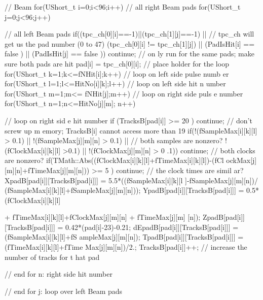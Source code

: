 \begin{DoxyCode}
{{{{{{{{{{          // Beam
          for(UShort_t i=0;i<96;i++) // all right Beam pads
            for(UShort_t j=0;j<96;j++){ // all left Beam pads
              if((tpc_ch[0][i]==-1)||(tpc_ch[1][j]==-1) || // tpc_ch will get us 
      the pad number (0 to 47)
              (tpc_ch[0][i] != tpc_ch[1][j]) || 
              (PadIsHit[i] == false ) || (PadIsHit[j] == false )) continue; // on
      ly run for the same pads; make sure both pads are hit
                pad[i] = tpc_ch[0][i]; // place holder for the loop
                for(UShort_t k=1;k<=fNHit[i];k++) // loop on left side pulse numb
      er
                  for(UShort_t l=1;l<=HitNo[i][k];l++) // loop on left side hit n
      umber
                    for(UShort_t m=1;m<= fNHit[j];m++) // loop on right side puls
      e number
                      for(UShort_t n=1;n<=HitNo[j][m]; n++){ // loop on right sid
      e hit number
                        if (TracksB[pad[i]] >= 20 ) continue; // don't screw up m
      emory; TracksB[i] cannot access more than 19
                        if(!(fSampleMax[i][k][l] > 0.1) || !(fSampleMax[j][m][n] 
      > 0.1)  || // both samples are nonzero?
                           !(fClockMax[i][k][l] >0.1) || !(fClockMax[j][m][n] > 0
      .1)) continue;  // both clocks are nonzero?
                        if(TMath::Abs((fClockMax[i][k][l]+fTimeMax[i][k][l])-(fCl
      ockMax[j][m][n]+fTimeMax[j][m][n])) >= 5 ) continue; // the clock times are simil
      ar?
                        XpadB[pad[i]][TracksB[pad[i]]] = 5.5*((fSampleMax[i][k][l
      ]-fSampleMax[j][m][n])/
                          (fSampleMax[i][k][l]+fSampleMax[j][m][n]));
                        YpadB[pad[i]][TracksB[pad[i]]] = 0.5*(fClockMax[i][k][l] 
      
                          + fTimeMax[i][k][l]+fClockMax[j][m][n] + fTimeMax[j][m]
      [n]);
                        ZpadB[pad[i]][TracksB[pad[i]]] = 0.42*(pad[i]-23)-0.21;
                        dEpadB[pad[i]][TracksB[pad[i]]] = (fSampleMax[i][k][l]+fS
      ampleMax[j][m][n]);
                        TpadB[pad[i]][TracksB[pad[i]]] = (fTimeMax[i][k][l]+fTime
      Max[j][m][n])/2.;
                        TracksB[pad[i]]++; // increase the number of tracks for t
      hat pad
                      } // end for n: right side hit number
            } // end for j: loop over left Beam pads 

}}}}}}}}}}
\end{DoxyCode}
